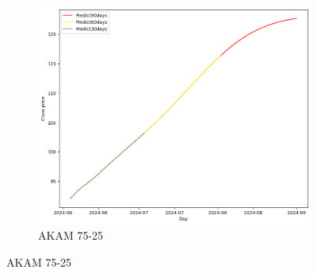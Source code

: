 \documentclass{ieeeojies}
\begin{document}
\begin{figure}[H]
    \hfill
    \begin{subfigure}[b]{0.33\linewidth}
        \centering
        \includegraphics[width=\linewidth]{LSTM Plot/AKAM_LSTM_75_25-90.png}
        \caption{AKAM 75-25}
        \label{fig:akam-75-25}
    \end{subfigure}
\end{figure}
\vspace{-20pt}
\end{document}
